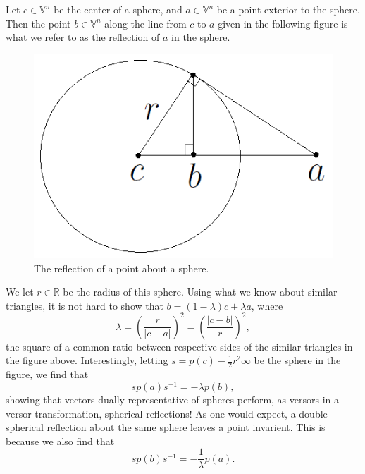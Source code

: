 \documentclass[12pt]{article}
\newcommand{\V}{\mathbb{V}}
\newcommand{\R}{\mathbb{R}}
\newcommand{\nvai}{\infty}
\begin{document}
Let $c\in\V^n$ be the center of a sphere, and $a\in\V^n$ be a point
exterior to the sphere.  Then the point $b\in\V^n$ along the line
from $c$ to $a$ given in the following figure is what we refer to
as the reflection of $a$ in the sphere.
\begin{figure}[H]\label{fig_spherical_reflection}
\centering
\includegraphics[scale=0.3]{SphericalReflectionFigure}
\caption{The reflection of a point about a sphere.}
\end{figure}
We let $r\in\R$ be the radius of this sphere.  Using what we know about similar
triangles, it is not hard to show that $b = (1-\lambda)c + \lambda a$,
where
\begin{equation*}
\lambda = \left(\frac{r}{|c-a|}\right)^2 = \left(\frac{|c-b|}{r}\right)^2,
\end{equation*}
the square of a common ratio between respective sides of the
similar triangles in the figure above.
Interestingly, letting $s=p(c)-\frac{1}{2}r^2\nvai$ be the sphere in the figure, we find that
\begin{equation*}
sp(a)s^{-1} = -\lambda p(b),
\end{equation*}
showing that vectors dually
representative of spheres perform, as versors in a versor transformation, spherical reflections!
As one would expect, a double spherical reflection about the same sphere leaves a point
invarient.  This is because we also find that
\begin{equation*}
sp(b)s^{-1} = -\frac{1}{\lambda}p(a).
\end{equation*}
\end{document}
